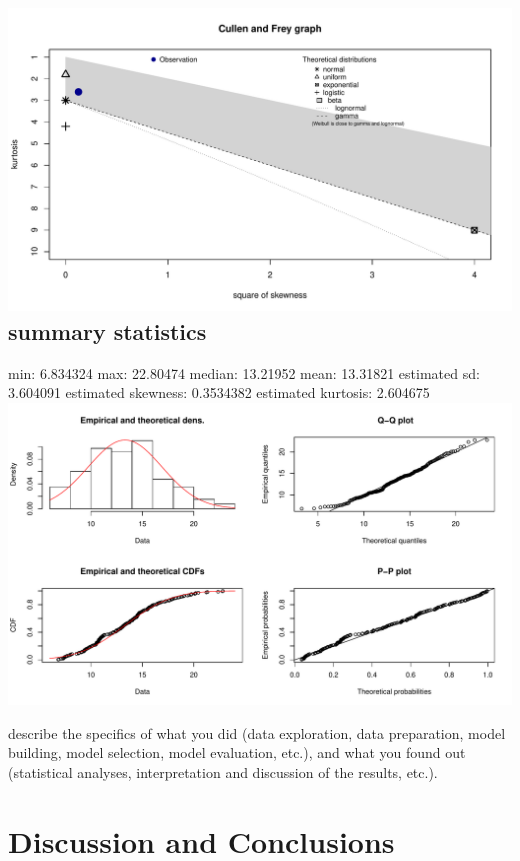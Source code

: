 \documentclass[]{elsarticle} %
\makeatletter
\def\maxwidth{\ifdim\Gin@nat@width>\linewidth\linewidth
\else\Gin@nat@width\fi}
\let\Oldincludegraphics\includegraphics
\renewcommand{\includegraphics}[1]{\Oldincludegraphics[width=\maxwidth]{#1}}
\makeatother
\begin{document}
\subsection{\texorpdfstring{\protect\includegraphics{Final_Project_files/figure-latex/unnamed-chunk-6-1.pdf}
summary statistics}{ summary statistics}}\label{summary-statistics}

min: 6.834324 max: 22.80474 median: 13.21952 mean: 13.31821 estimated
sd: 3.604091 estimated skewness: 0.3534382 estimated kurtosis: 2.604675
\includegraphics{Final_Project_files/figure-latex/unnamed-chunk-6-2.pdf}

describe the specifics of what you did (data exploration, data
preparation, model building, model selection, model evaluation, etc.),
and what you found out (statistical analyses, interpretation and
discussion of the results, etc.).

\section{Discussion and Conclusions}\label{discussion-and-conclusions}
\end{document}
